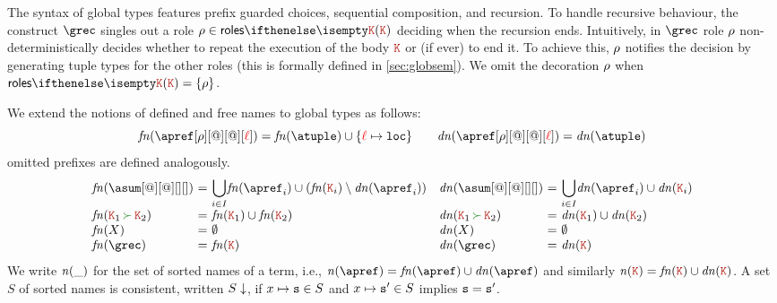 The syntax of global types features prefix guarded choices, sequential
composition, and recursion.
%
To handle recursive behaviour, 
the construct $\grec$ singles out a role $\arole \in \roles \aK$
%
deciding when the recursion ends.
%
Intuitively, in $\grec$ role  $\rho$ non-deterministically decides whether 
to repeat the execution of  the body $\aK$  or (if ever) to end it.
%
To achieve this,  $\rho$ notifies the decision by generating tuple types for the
other roles (this is formally defined in \cref{sec:globsem}).
%
We omit the decoration $\rho$ when $\roles \aK = \{\arole\}$.

We extend the notions of defined and free names to global types as
follows:
\[
 \fn{\apref[\arole][@][@][\alocvar]}
 = \fn \atuple \cup \{\alocvar \mapsto \asort[loc]\} 
\qquad
 \dn{\apref[\arole][@][@][\alocvar]} 
 = \dn \atuple 
\]
omitted prefixes are defined analogously.
\[
  \begin{array}{ll}
    \begin{array}{l@{\ =\ } ll}
      \fn{\asum[@][@][][]} & \displaystyle{\bigcup_{i\in I}} \fn{\apref_i} \cup (\fn{\aK_i}\setminus\dn{\apref_i})
      \\
      \fn{\aK_1 \seqop \aK_2} 
                &
                  \fn{\aK_1}\cup\fn{\aK_2}
      \\
      \fn X & \emptyset
      \\
      \fn \grec & \fn {\aK}
    \end{array}
    \begin{array}{l@{\ =\ } ll}
      \dn{\asum[@][@][][]} & \displaystyle{\bigcup_{i\in I}} \dn{\apref_i} \cup \dn{\aK_i}
      \\
      \dn{\aK_1 \seqop \aK_2} 
                           &
                             \dn{\aK_1}\cup\dn{\aK_2}
      \\
      \dn X & \emptyset
      \\
      \dn \grec & \dn {\aK}
    \end{array}
  \end{array}
\]
%
We write ${\it n}(\_)$ for the set of sorted names of a term, i.e.,
$\names \apref = \fn\apref \cup \dn\apref$ and similarly
$\names \aK = \fn\aK \cup \dn\aK$. A set $S$ of sorted names is
consistent, written $S\downarrow$, if $x\mapsto \mathtt{s} \in S$ and
$x\mapsto \mathtt{s}' \in S$ implies $\mathtt{s} = \mathtt{s}'$.
 
